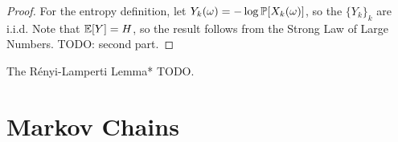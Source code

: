 \begin{proof}
    For the entropy definition, let \(Y_k(\omega) = - \log \mathbb{P}[X_k(\omega)]\), so the \(\{Y_k\}_k\) are i.i.d. Note that \(\mathbb{E}[Y] = H\), so the result follows from the Strong Law of Large Numbers. TODO: second part. 
\end{proof}


\begin{problem}{The R\'enyi-Lamperti Lemma}*
    TODO. 
\end{problem}



\newpage
\section{Markov Chains}




